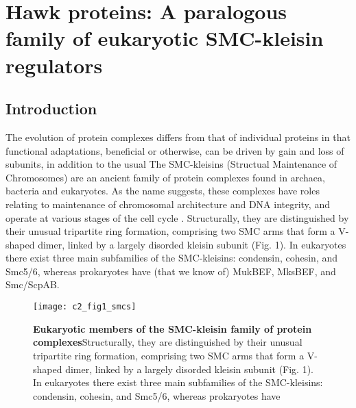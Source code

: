 \documentclass[a4paper,11pt,twoside,openright]{scrbook}
\begin{document}
\chapter{Hawk proteins: A paralogous family of eukaryotic SMC-kleisin regulators}


\section{Introduction}
The evolution of protein complexes differs from that of individual proteins in that functional adaptations, beneficial or otherwise, can be driven by gain and loss of subunits, in addition to the usual
The SMC-kleisins (Structual Maintenance of Chromosomes) are an ancient family of protein complexes found in archaea, bacteria and eukaryotes. As the name suggests, these complexes have roles relating to maintenance of chromosomal architecture and DNA integrity, and operate at various stages of the cell cycle \cite{Nasmyth2009, Hirano2016}. Structurally, they are distinguished by their unusual tripartite ring formation, comprising two SMC arms that form a V-shaped dimer, linked by a largely disorded kleisin subunit (Fig. 1). In eukaryotes there exist three main subfamilies of the SMC-kleisins: condensin, cohesin, and Smc5/6, whereas prokaryotes have (that we know of) MukBEF, MksBEF, and Smc/ScpAB.

\begin{figure}[h]
\fcapsideright
    {\caption[Eukaryotic members of the SMC-kleisin family of protein complexes]{\sffamily\textbf{Eukaryotic members of the SMC-kleisin family of protein complexes}\newline \rmfamily Structurally, they are distinguished by their unusual tripartite ring formation, comprising two SMC arms that form a V-shaped dimer, linked by a largely disorded kleisin subunit (Fig. 1). In eukaryotes there exist three main subfamilies of the SMC-kleisins: condensin, cohesin, and Smc5/6, whereas prokaryotes have }}
    {\texttt{[image: c2\_fig1\_smcs]}}
\end{figure}
\end{document}
